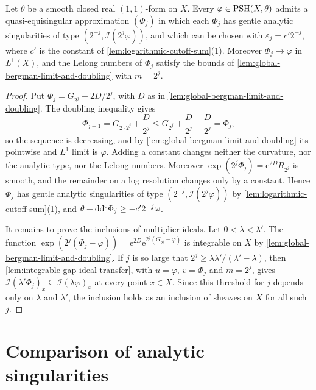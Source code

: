 \begin{theorem}\label{thm:gentle-quasi-equisingular-approximation}
Let $\theta$ be a smooth closed real $(1,1)$-form on $X$. Every $\varphi\in\mathrm{PSH}(X,\theta)$ admits a quasi-equisingular approximation $(\Phi_j)$ in which each $\Phi_j$ has gentle analytic singularities of type $(2^{-j},\mathcal I(2^j\varphi))$, and which can be chosen with $\varepsilon_j=c'2^{-j}$, where $c'$ is the constant of \cref{lem:logarithmic-cutoff-sum}(1). Moreover $\Phi_j\to\varphi$ in $L^1(X)$, and the Lelong numbers of $\Phi_j$ satisfy the bounds of \cref{lem:global-bergman-limit-and-doubling} with $m=2^j$.
\end{theorem}
\begin{proof}
Put $\Phi_j=G_{2^j}+2D/2^j$, with $D$ as in \cref{lem:global-bergman-limit-and-doubling}. The doubling inequality gives
\[
 \Phi_{j+1}=G_{2\cdot2^j}+\frac D{2^j}\leq G_{2^j}+\frac D{2^j}+\frac D{2^j}=\Phi_j,
\]
so the sequence is decreasing, and by \cref{lem:global-bergman-limit-and-doubling} its pointwise and $L^1$ limit is $\varphi$. Adding a constant changes neither the curvature, nor the analytic type, nor the Lelong numbers. Moreover $\exp(2^j\Phi_j)=\mathrm e^{2D}R_{2^j}$ is smooth, and the remainder on a log resolution changes only by a constant. Hence $\Phi_j$ has gentle analytic singularities of type $(2^{-j},\mathcal I(2^j\varphi))$ by \cref{lem:logarithmic-cutoff-sum}(1), and $\theta+\mathrm{dd}^{\mathrm{c}}\Phi_j\geq-c'2^{-j}\omega$.

It remains to prove the inclusions of multiplier ideals. Let $0<\lambda<\lambda'$. The function $\exp(2^j(\Phi_j-\varphi))=\mathrm e^{2D}\mathrm e^{2^j(G_{2^j}-\varphi)}$ is integrable on $X$ by \cref{lem:global-bergman-limit-and-doubling}. If $j$ is so large that $2^j\geq\lambda\lambda'/(\lambda'-\lambda)$, then \cref{lem:integrable-gap-ideal-transfer}, with $u=\varphi$, $v=\Phi_j$ and $m=2^j$, gives $\mathcal I(\lambda'\Phi_j)_x\subseteq\mathcal I(\lambda\varphi)_x$ at every point $x\in X$. Since this threshold for $j$ depends only on $\lambda$ and $\lambda'$, the inclusion holds as an inclusion of sheaves on $X$ for all such $j$.
\end{proof}

\section{Comparison of analytic singularities}
\label{sec:analytic-approximation-comparison}

